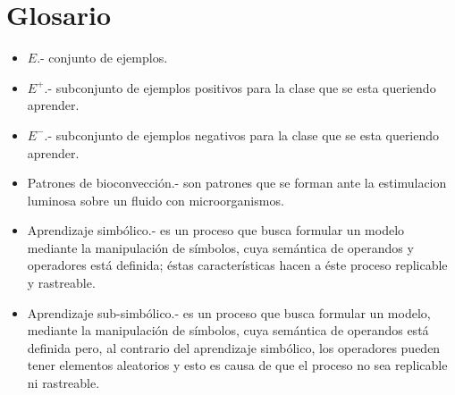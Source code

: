 \pagebreak
\section*{Glosario}


\begin{itemize}
	\item $E$.- conjunto de ejemplos. 
	\item $E^+$.-  subconjunto de ejemplos positivos para la clase que se esta queriendo aprender.
	\item $E^-$.- subconjunto de ejemplos negativos para la clase que se esta queriendo aprender.
	\item Patrones de bioconvección.- son patrones que se forman ante la estimulacion luminosa sobre un fluido con microorganismos.
	\item Aprendizaje simbólico.- es un proceso que busca formular un modelo mediante la manipulación de símbolos, cuya  semántica de operandos y operadores está definida; éstas características hacen a éste proceso replicable y rastreable.
	\item Aprendizaje sub-simbólico.- es un proceso que busca formular un modelo, mediante la manipulación de símbolos, cuya semántica de operandos está definida pero, al contrario del aprendizaje simbólico, los operadores pueden tener elementos aleatorios y esto es causa de que el proceso no sea replicable ni rastreable.
\end{itemize}
